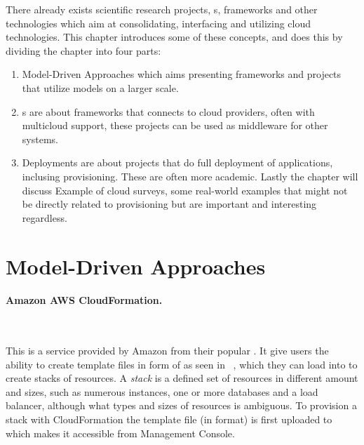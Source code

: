 
There already exists scientific research projects, s, frameworks 
and other technologies which aim at consolidating, interfacing and utilizing cloud technologies.
This chapter introduces some of these concepts, and does this by dividing the chapter into four parts:
\begin{enumerate}
  \item Model-Driven Approaches which aims presenting frameworks and projects that utilize
  models on a larger scale.
  \item {}s are about frameworks that connects to cloud providers, often with multicloud support,
  these projects can be used as middleware for other systems.
  \item Deployments are about projects that do full deployment of applications, inclusing provisioning.
  These are often more academic.
  Lastly the chapter will discuss \iitem Example of cloud surveys, some real-world examples
  that might not be directly related to provisioning but are important and interesting regardless.
\end{enumerate}

\section{Model-Driven Approaches}

\paragraph{Amazon AWS CloudFormation.}~\cite{aws}



This is a service provided by Amazon from their popular .
It give users the ability to create template files in form of 
 as seen in ~, 
which they can load into  to create stacks of resources. 
A \emph{stack} is a defined set of resources in different amount and sizes, 
such as numerous instances,
one or more databases and a load balancer, although what types and sizes of resources is ambiguous.
To provision a stack with CloudFormation the template file (in  format) is first uploaded to
 which makes it accessible from  Management Console.

